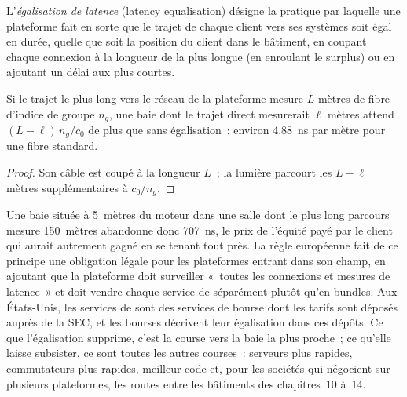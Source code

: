 \begin{definition}\label{def:nw:colocation-products-and-how-they-are-sold:equal}
L'\emph{égalisation de latence} (latency equalisation) désigne la pratique par laquelle une plateforme fait en sorte que le trajet de chaque client vers ses systèmes soit égal en
durée, quelle que soit la position du client dans le bâtiment, en coupant chaque connexion à la longueur de la plus longue (en enroulant le surplus)
ou en ajoutant un délai aux plus courtes.
\end{definition}

\begin{proposition}\label{prop:nw:colocation-products-and-how-they-are-sold:coil}
Si le trajet le plus long vers le réseau de la plateforme mesure $L$ mètres de fibre d'indice de groupe $n_g$, une baie dont le trajet direct mesurerait $\ell$ mètres
attend $(L - \ell)\,n_g / c_0$ de plus que sans égalisation~: environ \qty{4.88}{\nano\second} par mètre pour une fibre standard.
\end{proposition}

\begin{proof}
Son câble est coupé à la longueur $L$~; la lumière parcourt les $L-\ell$ mètres supplémentaires à $c_0/n_g$.
\end{proof}

Une baie située à 5~mètres du moteur dans une salle dont le plus long parcours mesure 150~mètres abandonne donc \qty{707}{\nano\second}, le prix de
l'équité payé par le client qui aurait autrement gagné en se tenant tout près. La règle européenne fait de ce principe une obligation légale pour les plateformes
entrant dans son champ, en ajoutant que la plateforme doit surveiller «~toutes les connexions et mesures de latence~» et doit vendre chaque service de 
séparément plutôt qu'en bundles. Aux États-Unis, les services de  sont des services de bourse dont les tarifs sont déposés auprès de la SEC, et les
bourses décrivent leur égalisation dans ces dépôts. Ce que l'égalisation supprime, c'est la course vers la baie la plus proche~; ce qu'elle laisse subsister, ce sont toutes les autres
courses~: serveurs plus rapides, commutateurs plus rapides, meilleur code et, pour les sociétés qui négocient sur plusieurs plateformes, les routes entre les bâtiments des chapitres~10
à~14.

